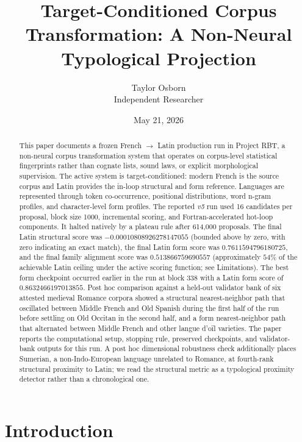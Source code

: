 \documentclass[11pt]{article}
\title{Target-Conditioned Corpus Transformation: A Non-Neural Typological Projection}
\author{Taylor Osborn \\ Independent Researcher}
\date{May 21, 2026}
\begin{document}
\maketitle

\begin{abstract}
This paper documents a frozen French $\rightarrow$ Latin production run in
Project RBT, a non-neural corpus transformation system that operates on
corpus-level statistical fingerprints rather than cognate lists, sound laws,
or explicit morphological supervision. The active system is target-conditioned:
modern French is the source corpus and Latin provides the in-loop structural
and form reference. Languages are represented through token co-occurrence,
positional distributions, word n-gram profiles, and character-level form
profiles. The reported \emph{v5} run used 16 candidates per proposal, block
size 1000, incremental scoring, and Fortran-accelerated hot-loop components.
It halted natively by a plateau rule after 614{,}000 proposals. The final
Latin structural score was $-0.00010808926278147055$ (bounded above by
zero, with zero indicating an exact match), the final Latin form score
was $0.7611594796180725$, and the final family alignment score was
$0.513866759690557$ (approximately $54\%$ of the achievable Latin ceiling
under the active scoring function; see Limitations). The best form
checkpoint occurred earlier in the run at
block 338 with a Latin form score of $0.8632466197013855$. Post hoc comparison
against a held-out validator bank of six attested medieval Romance corpora
showed a structural nearest-neighbor path that oscillated between Middle
French and Old Spanish during the first half of the run before settling on
Old Occitan in the second half, and a form nearest-neighbor path that
alternated between Middle French and other langue d'o\"il varieties. The paper
reports the computational setup, stopping rule, preserved checkpoints, and
validator-bank outputs for this run. A post hoc dimensional robustness
check additionally places Sumerian, a non-Indo-European language
unrelated to Romance, at fourth-rank structural proximity to Latin; we
read the structural metric as a typological proximity detector rather
than a chronological one.
\end{abstract}

\section{Introduction}
\end{document}
